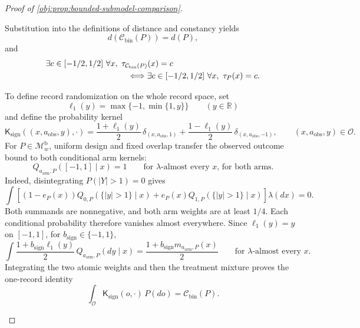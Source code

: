 \begin{proof}[Proof of \cref{obj:prop:bounded-submodel-comparison}]
\begin{enumerate}
\[\]
Substitution into the definitions of distance and constancy yields
\[
d(\mathcal C_{\mathrm{bin}}(P))=d(P),
\]
and
\[
\begin{split}
&\exists c\in[-1/2,1/2]\ 
  \forall x,\ \tau_{\mathcal C_{\mathrm{bin}}(P)}(x)=c\\
&\hspace{35mm}\Longleftrightarrow
\exists c\in[-1/2,1/2]\ 
  \forall x,\ \tau_P(x)=c.
\end{split}
\]

To define record randomization on the whole record space, set
\[
\ell_1(y)=\max\{-1,\min\{1,y\}\}\qquad(y\in\mathbb R)
\]
and define the probability kernel
\[
\mathsf K_{\mathrm{sign}}((x,a_{\mathrm{obs}},y),\cdot)
=
\frac{1+\ell_1(y)}2\,\delta_{(x,a_{\mathrm{obs}},1)}
+\frac{1-\ell_1(y)}2\,\delta_{(x,a_{\mathrm{obs}},-1)},
\qquad (x,a_{\mathrm{obs}},y)\in\mathcal O.
\]
For \(P\in\mathcal M_w^{\mathrm b}\), uniform design and fixed overlap transfer the observed outcome bound to both conditional arm kernels:
\[
Q_{a_{\mathrm{arm}},P}([-1,1]\mid x)=1
\qquad
\text{for \(\lambda\)-almost every \(x\), for both arms}.
\]
Indeed, disintegrating \(P(|Y|>1)=0\) gives
\[
\int
\left[
(1-e_P(x))Q_{0,P}(\{|y|>1\}\mid x)
+e_P(x)Q_{1,P}(\{|y|>1\}\mid x)
\right]\lambda(dx)=0.
\]
Both summands are nonnegative, and both arm weights are at least \(1/4\). Each conditional probability therefore vanishes almost everywhere. Since \(\ell_1(y)=y\) on \([-1,1]\), for \(b_{\mathrm{sign}}\in\{-1,1\}\),
\[
\int
\frac{1+b_{\mathrm{sign}}\ell_1(y)}2\,
Q_{a_{\mathrm{arm}},P}(dy\mid x)
=
\frac{1+b_{\mathrm{sign}}m_{a_{\mathrm{arm}},P}(x)}2
\qquad\text{for \(\lambda\)-almost every \(x\)}.
\]
Integrating the two atomic weights and then the treatment mixture proves the one-record identity
\[
\int_{\mathcal O}\mathsf K_{\mathrm{sign}}(o,\cdot)\,P(do)
=\mathcal C_{\mathrm{bin}}(P).
\]


\end{enumerate}
\end{proof}
